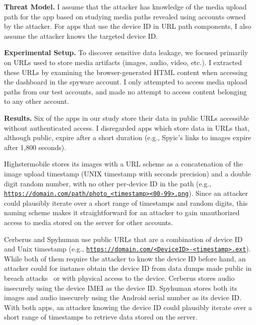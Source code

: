 \textbf{Threat Model.} I assume that the attacker has knowledge of
the media upload path for the app based on studying media paths
revealed using accounts owned by the attacker.  For apps that use the
device ID in URL path components, I also assume the attacker knows
the targeted device ID.

\textbf{Experimental Setup.} To discover sensitive data leakage, we
focused primarily on URLs used to store media artifacts (images,
audio, video, etc.).  I extracted these URLs by examining the
browser-generated HTML content when accessing the dashboard in the
spyware account.  I only attempted to access media upload paths from
our test accounts, and made no attempt to access content belonging to
any other account.


\textbf{Results.}  Six of the apps in our study store their data in
public URLs accessible without authenticated access.  I disregarded
apps which store data in URLs that, although public, expire after a
short duration (e.g., Spyic's links to images expire after 1,800
seconds).


Highstermobile stores its images with a URL scheme as a concatenation
of the image upload timestamp (UNIX timestamp with seconds precision)
and a double digit random number, with no other per-device ID in the
path (e.g.,
\texttt{\url{https://domain.com/path/photo_<timestamp><00-99>.png}}).
Since an attacker could plausibly iterate over a short range of
timestamps and random digits, this naming scheme makes it
straightforward for an attacker to gain unauthorized access to media
stored on the server for other accounts.

Cerberus and Spyhuman use public URLs that are a combination of device
ID and Unix timestamp
(e.g., \texttt{\url{https://domain.com/<DeviceID>-<timestamp>.ext}}).
While both of them require the attacker to know the device ID before
hand, an attacker could for instance obtain the device ID from data
dumps made public in breach attacks~\cite{mSpybrea38:online,
  Companyt8:online, HackerSt66:online, Cerberus12:online,
  Stalkerw59:online} or with physical access to the device.
Cerberus stores audio insecurely using the device IMEI as the device
ID.  Spyhuman stores both its images and audio insecurely using the
Android serial number as its device ID.  With both apps, an attacker
knowing the device ID could plausibly iterate over a short range of
timestamps to retrieve data stored on the server.

